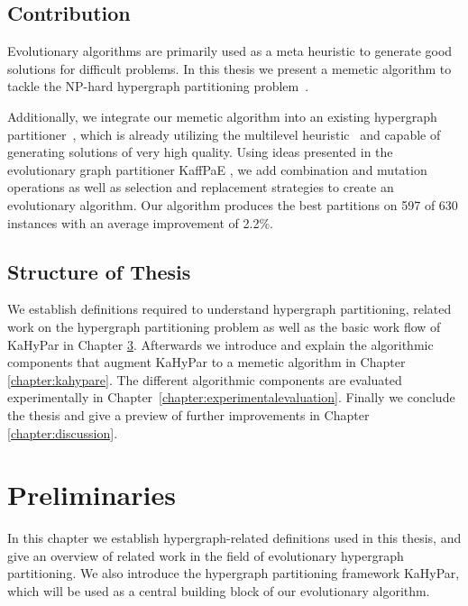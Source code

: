 \documentclass[a4paper,12pt,titlepage, BCOR7mm,headsepline]{scrbook}
\numberwithin{equation}{section}
\begin{document}
\section{Contribution}
Evolutionary algorithms are primarily used as a meta heuristic to generate good solutions for difficult problems. %
In this thesis we present a memetic algorithm to tackle the NP-hard hypergraph partitioning problem~\cite{garey2002computers}.

Additionally, we integrate our memetic algorithm into an existing hypergraph partitioner~\cite{schlag2016k}, which is already utilizing the multilevel heuristic~\cite{bulucc2016recent} and capable of generating solutions of very high quality. Using ideas presented in the evolutionary graph partitioner KaffPaE \cite{sanders2012distributed}, we add combination and mutation operations as well as selection and replacement strategies to create an evolutionary algorithm. Our algorithm produces the best partitions on 597 of 630 instances with an average improvement of 2.2\%.
\section{Structure of Thesis}
We establish definitions required to understand hypergraph partitioning, related work on the hypergraph partitioning problem as well as the basic work flow of KaHyPar in Chapter \ref{chapter:preliminaries}.
Afterwards we introduce and explain the algorithmic components that augment KaHyPar to a memetic algorithm in Chapter \ref{chapter:kahypare}. 
The different algorithmic components are evaluated experimentally in Chapter~\ref{chapter:experimentalevaluation}.
Finally we conclude the thesis and give a preview of further improvements in Chapter \ref{chapter:discussion}.
\chapter{Preliminaries}
\label{chapter:preliminaries}
In this chapter we establish hypergraph-related definitions used in this thesis, and give an overview of related work in the field of evolutionary hypergraph partitioning. We also introduce the hypergraph partitioning framework KaHyPar, which will be used as a central building block of our evolutionary algorithm.%
\end{document}

